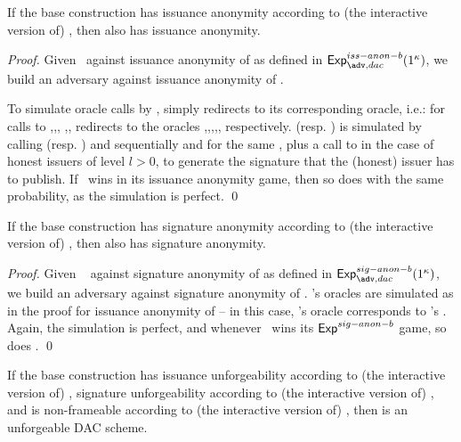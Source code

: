 \begin{theorem}
  If the base \CUASGenInt construction has issuance anonymity according to
  (the interactive version of) , then \CUASDAC
  also has issuance anonymity.
\end{theorem}

\begin{proof}
  Given \adv~against issuance anonymity of \CUASDAC as defined in
  $\Exp^{iss-anon-b}_{\adv,dac}(1^\secpar)$, we build an adversary \advB against
  issuance anonymity of \CUASGenInt.

  To simulate oracle calls by \adv, \advB simply redirects to its corresponding
  oracle, i.e.: for calls to ,,,
  ,, \advB redirects to the \CUASGenInt oracles
  \HUGEN,\CUGEN,\OBTAIN,\SIGN,\OBTCHALb, respectively.  (resp.
  ) is simulated by calling \HUGEN (resp. \CUGEN) and \ISET
  sequentially and for the same \uid, plus a call to \SIGN in the case of
  honest issuers of level $l>0$, to generate the signature \Sig that the
  (honest) issuer has to publish.
  If \adv~wins in its issuance anonymity game, then so does \advB with the same
  probability, as the simulation is perfect.
  \qed
\end{proof}

\begin{theorem}
  If the base \CUASGenInt construction has signature anonymity according to
  (the interactive version of) , then \CUASDAC
  also has signature anonymity.
\end{theorem}

\begin{proof}
  Given \adv~ against signature anonymity of \CUASDAC as defined in
  $\Exp^{sig-anon-b}_{\adv,dac}(1^\secpar)$, we build an adversary \advB against
  signature anonymity of \CUASGenInt.
  \adv's oracles are simulated as in the proof for issuance anonymity of
  \CUASDAC -- in this case, \adv's  oracle corresponds to \advB's
  \CHALb. Again, the simulation is perfect, and whenever \adv~wins its
  $\mathsf{Exp}^{sig-anon-b}$ game, so does \advB.
  \qed
\end{proof}

\begin{theorem}
  If the base \CUASGenInt construction has issuance unforgeability according to
  (the interactive version of) , signature
  unforgeability according to (the interactive version of)
  , and is non-frameable according to (the
  interactive version of) , then \CUASDAC is an
  unforgeable DAC scheme.
\end{theorem}


